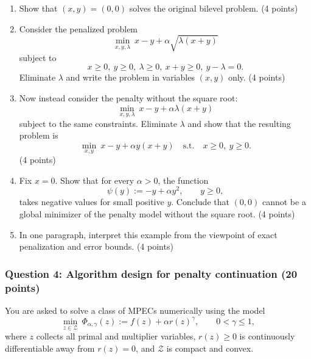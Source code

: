 \documentclass[pdflatex,sn-mathphys-num]{sn-jnl}%
\theoremstyle{definition}
\begin{document}
\begin{enumerate}[label=(\alph*)]
    \item Show that \((x,y)=(0,0)\) solves the original bilevel problem. (4 points)

    \item Consider the penalized problem
    \[
    \min_{x,y,\lambda}\ x-y+\alpha \sqrt{\lambda(x+y)}
    \]
    subject to
    \[
    x\ge 0,\ y\ge 0,\ \lambda\ge 0,\ x+y\ge 0,\ y-\lambda=0.
    \]
    Eliminate \(\lambda\) and write the problem in variables \((x,y)\) only. (4 points)

    \item Now instead consider the penalty without the square root:
    \[
    \min_{x,y,\lambda}\ x-y+\alpha \lambda(x+y)
    \]
    subject to the same constraints.
    Eliminate \(\lambda\) and show that the resulting problem is
    \[
    \min_{x,y}\ x-y+\alpha y(x+y)
    \quad \text{s.t.} \quad x\ge 0,\ y\ge 0.
    \]
    (4 points)

    \item Fix \(x=0\). Show that for every \(\alpha>0\), the function
    \[
    \psi(y):=-y+\alpha y^2,\qquad y\ge 0,
    \]
    takes negative values for small positive \(y\). Conclude that \((0,0)\) cannot be a global minimizer of the penalty model without the square root. (4 points)

    \item In one paragraph, interpret this example from the viewpoint of exact penalization and error bounds. (4 points)
\end{enumerate}

\subsubsection*{Question 4: Algorithm design for penalty continuation (20 points)}

You are asked to solve a class of MPECs numerically using the model
\[
\min_{z\in \mathcal Z}\ \Phi_{\alpha,\gamma}(z):=f(z)+\alpha r(z)^\gamma,
\qquad 0<\gamma\le 1,
\]
where \(z\) collects all primal and multiplier variables, \(r(z)\ge 0\) is continuously differentiable away from \(r(z)=0\), and \(\mathcal Z\) is compact and convex.
\end{document}
